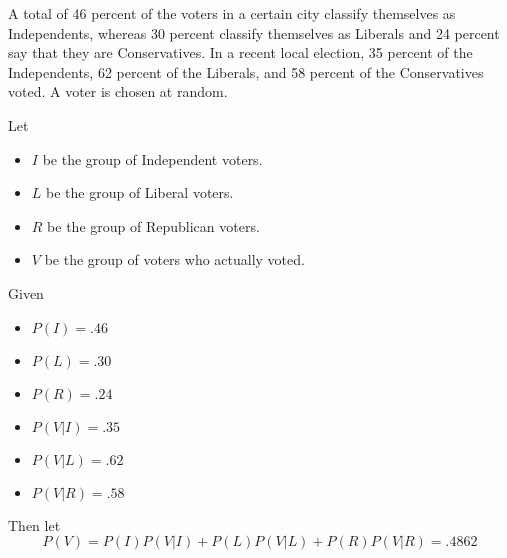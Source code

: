\documentclass{article}
\begin{document}
\begin{spacing}{1.1}
\maketitle

\newpage
\begin{homeworkProblem}
  A total of 46 percent of the voters in a certain city classify 
  themselves as Independents, whereas 30 percent classify themselves 
  as Liberals and 24 percent say that they are Conservatives. In a 
  recent local election, 35 percent of the Independents, 62 percent 
  of the Liberals, and 58 percent of the Conservatives voted. A voter 
  is chosen at random. 

  Let
  \begin{itemize}
    \item $I$ be the group of Independent voters.
    \item $L$ be the group of Liberal voters.
    \item $R$ be the group of Republican voters.
    \item $V$ be the group of voters who actually voted.
  \end{itemize}
  Given
  \begin{itemize}
    \item $P( I) = .46$ 
    \item $P( L) = .30$ 
    \item $P( R) = .24$
    \item $P( V|I) = .35$
    \item $P( V|L) = .62$
    \item $P( V|R) = .58$
  \end{itemize}
  Then let
    \[P( V) = P( I) P( V|I) + P( L) P( V|L) + P( R) P( V|R) = .4862\]


\end{homeworkProblem}
\end{spacing}
\end{document}
